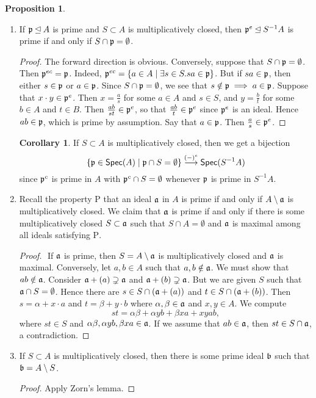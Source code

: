 \documentclass[10pt,letterpaper,cm]{nupset}
\theoremstyle{definition}
\newtheorem{prop}{Proposition}
\newtheorem{corollary}{Corollary}
\newcommand{\1}{\mathbf{1}}
\newcommand{\p}{\frak{p}}
\newcommand{\0}{\vec 0}
\newcommand{\Rho}{\mathrm{P}}
\begin{document}
\begin{prop} $ $
\begin{enumerate}
\item If $\frak{p} \unlhd A$ is prime and $ S\subset A$ is multiplicatively closed, then $\frak{p}^e \unlhd S^{-1}A$ is prime if and only if $S \cap \frak{p} = \emptyset$. 
\begin{proof}
The forward direction is obvious. Conversely, suppose that $S \cap \frak{p} = \emptyset$. Then $\p^{ec} = \p$. Indeed, $\p^{ec} = \{a\in A\mid \exists s \in S. sa \in \p \}$. But if $sa\in \p$, then either $s\in \p$ or $a\in \p$. Since $S \cap \p = \emptyset$, we see that $s\notin \p \implies a\in \p$. Suppose that $x\cdot y\in \p^e$. Then $x= \frac{a}{s}$ for some $a\in A$ and $s\in S$, and $y = \frac{b}{t}$ for some $b\in A$ and $t\in B$.  Then $\frac{ab}{st}\in \p^e$, so that $\frac{ab}{t} \in \p^e$ since $\p^e$ is an ideal. Hence $ab \in \p$, which is prime by assumption. Say that $a\in \p$. Then $\frac{a}{s} \in \p^e$. 
\end{proof}
\begin{corollary} If $S \subset A$ is multiplicatively closed, then we get a bijection $$\{ \p \in \mathsf{Spec}(A) \mid \p \cap S=\emptyset\} \overset{(-)^e}{\longrightarrow}\mathsf{Spec}(S^{-1}A) $$ since $\p^c$ is prime in $A$ with $\p^c \cap S = \emptyset$ whenever $\p$ is prime in $S^{-1}A$.
\end{corollary}
\item Recall the property $\Rho$ that an ideal $\frak{a}$ in $A$ is prime if and only if $A\setminus  \frak{a}$ is multiplicatively closed. We claim that $\frak{a}$ is prime if and only if there is some multiplicatively closed $S\subset \frak{a}$ such that $S \cap A = \emptyset$ and $\frak{a}$ is maximal among all ideals satisfying $\Rho$.
\begin{proof} $ $
If $\frak{a}$ is prime, then $S=A \setminus \frak{a}$ is multiplicatively closed and $\frak{a}$ is maximal.
Conversely, let $a,b \in A$ such that $a,b \notin \frak{a}$. We must show that $ab \notin \frak{a}$. Consider $\frak{a} +(a) \supsetneq \frak{a}$ and $\frak{a} +(b) \supsetneq \frak{a}$. But we are given $S$ such that $\frak{a} \cap S = \emptyset$. Hence there are $s\in S \cap (\frak{a} +(a))$ and $t\in S \cap (\frak{a} +(b))$.   Then $s = \alpha + x \cdot a $ and $t= \beta + y \cdot b$ where $\alpha, \beta \in \frak{a}$ and $x,y\in A$. We compute $$  st = \alpha \beta + \alpha y b + \beta x a + xyab , $$ where $st\in S$ and $\alpha \beta, \alpha y b, \beta x a  \in \frak{a}$.  If we assume that $ab\in \frak{a}$, then $st\in S \cap \frak{a}$, a contradiction. 
\end{proof}
\item If $S\subset A$ is multiplicatively closed, then there is some prime ideal $\frak{b}$ such that $\frak{b} = A \setminus S$.
\begin{proof}
Apply Zorn's lemma.
\end{proof}
\end{enumerate}
\end{prop}
\end{document}

